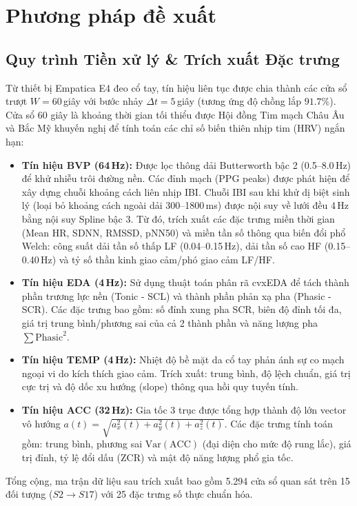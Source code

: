 \documentclass[conference]{IEEEtran}
\begin{document}
\section{Phương pháp đề xuất}

\subsection{Quy trình Tiền xử lý \& Trích xuất Đặc trưng}
Từ thiết bị Empatica E4 đeo cổ tay, tín hiệu liên tục được chia thành các cửa sổ trượt $W = 60$\,giây với bước nhảy $\Delta t = 5$\,giây (tương ứng độ chồng lắp $91.7\%$). Cửa sổ 60 giây là khoảng thời gian tối thiểu được Hội đồng Tim mạch Châu Âu và Bắc Mỹ khuyến nghị để tính toán các chỉ số biến thiên nhịp tim (HRV) ngắn hạn:
\begin{itemize}
    \item \textbf{Tín hiệu BVP (64\,Hz):} Được lọc thông dải Butterworth bậc 2 (0.5--8.0\,Hz) để khử nhiễu trôi đường nền. Các đỉnh mạch (PPG peaks) được phát hiện để xây dựng chuỗi khoảng cách liên nhịp IBI. Chuỗi IBI sau khi khử dị biệt sinh lý (loại bỏ khoảng cách ngoài dải 300--1800\,ms) được nội suy về lưới đều 4\,Hz bằng nội suy Spline bậc 3. Từ đó, trích xuất các đặc trưng miền thời gian (Mean HR, SDNN, RMSSD, pNN50) và miền tần số thông qua biến đổi phổ Welch: công suất dải tần số thấp LF (0.04--0.15\,Hz), dải tần số cao HF (0.15--0.40\,Hz) và tỷ số thần kinh giao cảm/phó giao cảm LF/HF.
    \item \textbf{Tín hiệu EDA (4\,Hz):} Sử dụng thuật toán phân rã cvxEDA để tách thành phần trương lực nền (Tonic - SCL) và thành phần phản xạ pha (Phasic - SCR). Các đặc trưng bao gồm: số đỉnh xung pha SCR, biên độ đỉnh tối đa, giá trị trung bình/phương sai của cả 2 thành phần và năng lượng pha $\sum \text{Phasic}^2$.
    \item \textbf{Tín hiệu TEMP (4\,Hz):} Nhiệt độ bề mặt da cổ tay phản ánh sự co mạch ngoại vi do kích thích giao cảm. Trích xuất: trung bình, độ lệch chuẩn, giá trị cực trị và độ dốc xu hướng (slope) thông qua hồi quy tuyến tính.
    \item \textbf{Tín hiệu ACC (32\,Hz):} Gia tốc 3 trục được tổng hợp thành độ lớn vector vô hướng $a(t) = \sqrt{a_x^2(t) + a_y^2(t) + a_z^2(t)}$. Các đặc trưng tính toán gồm: trung bình, phương sai $\text{Var}(\text{ACC})$ (đại diện cho mức độ rung lắc), giá trị đỉnh, tỷ lệ đổi dấu (ZCR) và mật độ năng lượng phổ gia tốc.
\end{itemize}

Tổng cộng, ma trận dữ liệu sau trích xuất bao gồm 5.294 cửa sổ quan sát trên 15 đối tượng ($S2 \rightarrow S17$) với 25 đặc trưng số thực chuẩn hóa.
\end{document}
